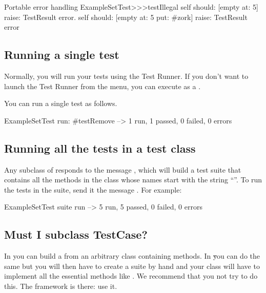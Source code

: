 \documentclass[a4paper,10pt,twoside]{book}
\begin{document}
\begin{method}[portabletestillegal]{Portable error handling}
ExampleSetTest>>>testIllegal
	self should: [empty at: 5] raise: TestResult error.
	self should: [empty at: 5 put: #zork] raise: TestResult error
\end{method}


\subsection{Running a single test}
Normally, you will run your tests using the Test Runner.
If you don't want to launch the Test Runner from the  menu, you can execute  as a .

You can run a single test as follows.

\begin{code}{}
ExampleSetTest run: #testRemove --> 1 run, 1 passed, 0 failed, 0 errors
\end{code}

\subsection{Running all the tests in a test class}

Any subclass of  responds to the message , which will build a test suite that contains all the
methods in the class whose names start with the string ``''.
To run the tests in the suite, send it the message .
For example:

\begin{code}{}
ExampleSetTest suite run --> 5 run, 5 passed, 0 failed, 0 errors
\end{code}

\subsection{Must I subclass TestCase?}

In \JUnit{} you can build a  from an arbitrary class
containing  methods.  In \st you can do the same
but you will then have to create a suite by hand and your class will
have to implement all the essential  methods like .
We recommend that you not try to do this.  The framework is there: use it.
\end{document}
